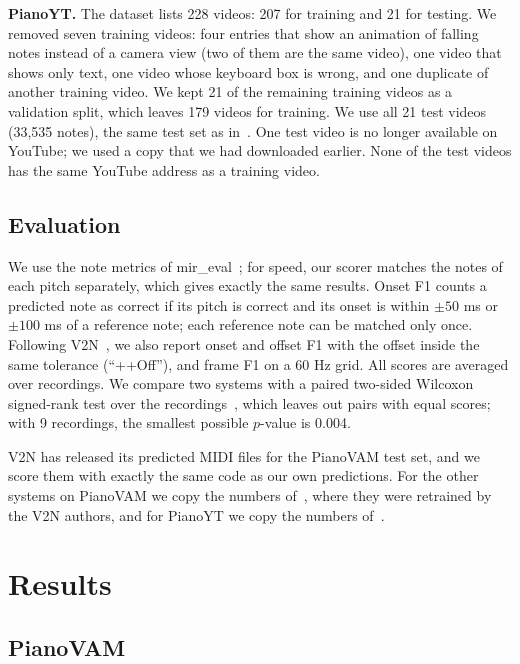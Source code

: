 \documentclass[pdflatex,sn-mathphys-num]{sn-jnl}
\begin{document}
\textbf{PianoYT.} The dataset lists 228 videos: 207 for training and 21 for testing. We removed seven training videos: four entries that show an animation of falling notes instead of a camera view (two of them are the same video), one video that shows only text, one video whose keyboard box is wrong, and one duplicate of another training video. We kept 21 of the remaining training videos as a validation split, which leaves 179 videos for training. We use all 21 test videos (33,535 notes), the same test set as in~\cite{zivanovic2025}. One test video is no longer available on YouTube; we used a copy that we had downloaded earlier. None of the test videos has the same YouTube address as a training video.

\subsection{Evaluation}

We use the note metrics of mir\_eval~\cite{raffel2014}; for speed, our scorer matches the notes of each pitch separately, which gives exactly the same results. Onset F1 counts a predicted note as correct if its pitch is correct and its onset is within $\pm50$ ms or $\pm100$ ms of a reference note; each reference note can be matched only once. Following V2N~\cite{kim2026v2n}, we also report onset and offset F1 with the offset inside the same tolerance (``++Off''), and frame F1 on a 60 Hz grid. All scores are averaged over recordings. We compare two systems with a paired two-sided Wilcoxon signed-rank test over the recordings~\cite{wilcoxon1945}, which leaves out pairs with equal scores; with 9 recordings, the smallest possible $p$-value is 0.004.

V2N has released its predicted MIDI files for the PianoVAM test set, and we score them with exactly the same code as our own predictions. For the other systems on PianoVAM we copy the numbers of~\cite{kim2026v2n}, where they were retrained by the V2N authors, and for PianoYT we copy the numbers of~\cite{zivanovic2025}.

\section{Results}\label{sec:results}

\subsection{PianoVAM}\label{sec:res-vam}
\end{document}
